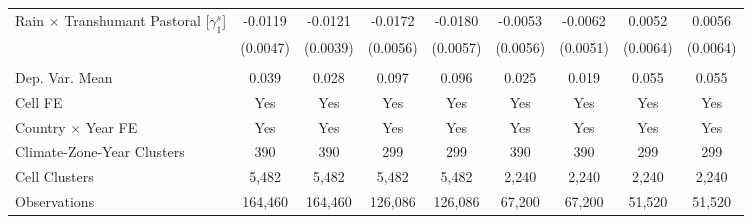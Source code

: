{\begin{tabular}{l*{8}{c}}
\addlinespace
\hspace{15pt} Rain $\times$ Transhumant Pastoral [$\gamma^{s}_{1}$]&-0.0119\sym{**} &-0.0121\sym{***}&-0.0172\sym{***}&-0.0180\sym{***}&-0.0053         &-0.0062         &0.0052         &0.0056         \\
                    &(0.0047)         &(0.0039)         &(0.0056)         &(0.0057)         &(0.0056)         &(0.0051)         &(0.0064)         &(0.0064)         \\
\midrule
\\ Dep. Var. Mean   & 0.039         & 0.028         & 0.097         & 0.096         & 0.025         & 0.019         & 0.055         & 0.055         \\
Cell FE             &   Yes         &   Yes         &   Yes         &   Yes         &   Yes         &   Yes         &   Yes         &   Yes         \\
Country $\times$ Year FE&   Yes         &   Yes         &   Yes         &   Yes         &   Yes         &   Yes         &   Yes         &   Yes         \\
Climate-Zone-Year Clusters&   390         &   390         &   299         &   299         &   390         &   390         &   299         &   299         \\
Cell Clusters       & 5,482         & 5,482         & 5,482         & 5,482         & 2,240         & 2,240         & 2,240         & 2,240         \\
Observations        &164,460         &164,460         &126,086         &126,086         &67,200         &67,200         &51,520         &51,520         \\
\bottomrule
\end{tabular}
}
